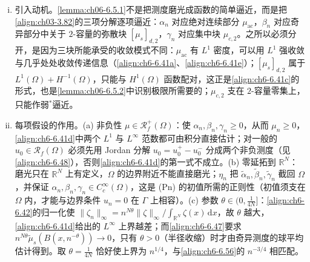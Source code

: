 \documentclass[../../main.tex]{subfiles}%
\begin{document}
\begin{remark}\label{remark:ch06-6.5.1动机}
\begin{enumerate}[(i)]
\item 引入动机。\cref{lemma:ch06-6.5.1}不是把测度磨光成函数的简单逼近，而是把\eqref{align:ch03-3.82}的三项分解逐项逼近：$\alpha_n$ 对应绝对连续部分 $\mu_{\mathrm{ac}}$，$\beta_n$ 对应奇异部分中关于 $2$-容量的弥散块 $[\mu_s]_{d,2}$，$\gamma_n$ 对应集中块 $\mu_{c,2}$。之所以必须分开，是因为三块所能承受的收敛模式不同：$\mu_{\mathrm{ac}}$ 有 $L^1$ 密度，可以用 $L^1$ 强收敛与几乎处处收敛传递信息（\eqref{align:ch6-6.41a}、\eqref{align:ch6-6.41e}）；$[\mu_s]_{d,2}$ 属于 $L^1(\Omega)+H^{-1}(\Omega)$，只能与 $H^1(\Omega)$ 函数配对，这正是\eqref{align:ch6-6.41c}的形式，也是\cref{lemma:ch06-6.5.2}中识别极限所需要的；$\mu_{c,2}$ 支在 $2$-容量零集上，只能作弱$^*$逼近。
\item 每项假设的作用。(a) 非负性 $\mu\in\mathscr{R}^+_f(\Omega)$：使 $\alpha_n,\beta_n,\gamma_n\geqslant0$，从而 $\mu_n\geqslant0$，\eqref{align:ch6-6.41d}中两个 $L^1$ 与 $L^\infty$ 范数都可由积分直接估计；对一般的 $u_0\in\mathscr{R}_f(\Omega)$ 必须先用 Jordan 分解 $u_0=u^+_0-u^-_0$ 分成两个非负测度（见\eqref{align:ch6-6.48}），否则\eqref{align:ch6-6.41d}的第一式不成立。(b) 零延拓到 $\mathbb{R}^N$：磨光只在 $\mathbb{R}^N$ 上有定义，$\Omega$ 的边界附近不能直接磨光；$\eta_n$ 把 $\widetilde\alpha_n,\widetilde\beta_n,\widetilde\gamma_n$ 截回 $\Omega$，并保证 $\alpha_n,\beta_n,\gamma_n\in C^\infty_c(\Omega)$，这是 (Pn) 的初值所需的正则性（初值须支在 $\Omega$ 内，才能与边界条件 $u_n=0$ 在 $\Gamma$ 上相容）。(c) 参数 $\theta\in(0,\frac{1}{4N}]$：\eqref{align:ch6-6.42}的归一化使 $\|\zeta_n\|_\infty=n^{N\theta}\|\zeta\|_\infty/\int_{\mathbb{R}^N}\zeta(x)\,\mathrm{d}x$，故 $\theta$ 越大，\eqref{align:ch6-6.41d}给出的 $L^\infty$ 上界越差；而\eqref{align:ch6-6.47}要求 $n^{N\theta}\widetilde\mu_s(B(x,n^{-\theta}))\to0$，只有 $\theta>0$（半径收缩）时才由奇异测度的球平均估计得到。取 $\theta=\frac{1}{4N}$ 恰好使上界为 $n^{1/4}$，与\eqref{align:ch6-6.56}的 $n^{-3/4}$ 相匹配。

\end{enumerate}
\end{remark}
\end{document}

